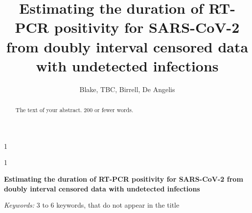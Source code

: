 \documentclass[12pt]{article}
\newcommand{\blind}{1}
\newcommand{\fulltitle}{Estimating the duration of RT-PCR positivity for SARS-CoV-2 from doubly interval censored data with undetected infections}
\begin{document}
%

\def\spacingset#1{\renewcommand{\baselinestretch}%
{#1}\small\normalsize} \spacingset{1}



\blind
{
  \title{\bf \fulltitle}
  \author{%
    Blake, TBC, Birrell, De Angelis  
  }
  \maketitle
} \fi

\blind
{
  \bigskip
  \bigskip
  \bigskip
  \begin{center}
    {\LARGE\bf \fulltitle}
\end{center}
  \medskip
} \fi

\bigskip
\begin{abstract}
The text of your abstract. 200 or fewer words.
\end{abstract}

\noindent%
{\it Keywords:}  3 to 6 keywords, that do not appear in the title
\vfill

\newpage

\listoftodos
\end{document}

